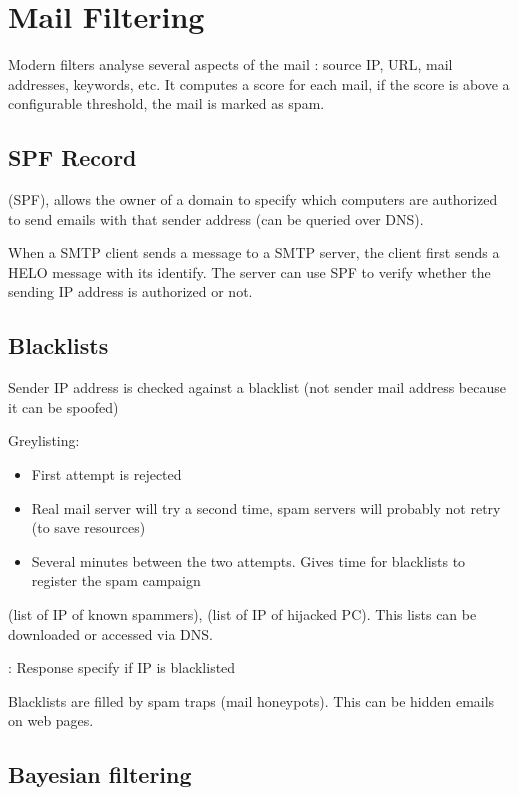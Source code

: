 \section{Mail Filtering}

Modern filters analyse several aspects of the mail : source IP, URL, mail addresses, keywords, etc. It computes a score for each mail, if the score is above a configurable threshold, the mail is marked as spam.

\subsection{SPF Record}

 (SPF), allows the owner of a domain to specify which computers are authorized to send emails with that sender address (can be queried over DNS).

When a SMTP client sends a message to a SMTP server, the client first sends a HELO message with its identify. The server can use SPF to verify whether the sending IP address is authorized or not.

\newpage
\subsection{Blacklists}

Sender IP address is checked against a blacklist (not sender mail address because it can be spoofed)

Greylisting:
\begin{itemize}
    \item First attempt is rejected
    \item Real mail server will try a second time, spam servers will probably not retry (to save resources)
    \item Several minutes between the two attempts. Gives time for blacklists to register the spam campaign
\end{itemize}

 (list of IP of known spammers),  (list of IP of hijacked PC). This lists can be downloaded or accessed via DNS.

 : Response specify if IP is blacklisted

Blacklists are filled by spam traps (mail honeypots). This can be hidden emails on web pages.

\subsection{Bayesian filtering}

